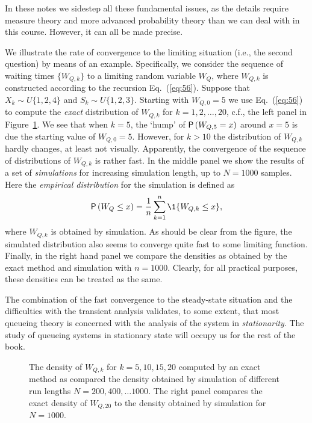 In these notes we sidestep all these fundamental issues, as the
details require measure theory and more advanced probability theory
than we can deal with in this course. However, it can all be made
precise. 

We illustrate the rate of convergence to the limiting situation (i.e., the second question) by means of an example. Specifically, we consider the sequence of waiting times $\{W_{Q,k}\}$ to a limiting random variable $W_Q$, where $W_{Q,k}$ is constructed according to the recursion
Eq.~(\ref{eq:56}). Suppose that $X_k\sim U\{1,2,4\}$ and
$S_k\sim U\{1,2,3\}$.  Starting with $W_{Q,0}=5$ we use
Eq.~(\ref{eq:56}) to compute the \emph{exact} distribution of
$W_{Q,k}$ for $k=1,2,\ldots, 20$, c.f., the left panel in
Figure~\ref{fig:convergence}. We see that when $k=5$, the `hump' of
$\P{W_{Q,5}=x}$ around $x=5$ is due the starting value of
$W_{Q,0}=5$. However, for $k>10$ the distribution of $W_{Q,k}$ hardly
changes, at least not visually. Apparently, the convergence of the
sequence of distributions of $W_{Q,k}$ is rather fast. In the middle
panel we show the results of a set of \emph{simulations} for
increasing simulation length, up to $N=1000$ samples. Here the
\emph{empirical distribution} for the simulation is defined as
\begin{equation*}
\P{W_Q\leq x} =   \frac 1n \sum_{k=1}^n \1{W_{Q,k} \leq x},
\end{equation*}
where $W_{Q,k}$ is obtained by simulation. As should be clear from the
figure, the simulated distribution also seems to converge quite fast to
some limiting function. Finally, in the right hand panel we compare
the densities as obtained by the exact method and simulation with
$n=1000$. Clearly, for all practical purposes, these densities can be
treated as the same.

The combination of the fast convergence to the steady-state situation
and the difficulties with the transient analysis validates, to some
extent, that most queueing theory is concerned with the analysis of
the system in \emph{stationarity}. The study of queueing systems in
stationary state will occupy us for the rest of the book.

\begin{figure}
  \centering



  \caption{The density of $W_{Q,k}$ for $k=5, 10, 15, 20$ computed by
    an exact method as compared the density obtained by simulation of
    different run lengths $N=200, 400, \ldots 1000$. The right panel
    compares the exact density of $W_{Q,20}$ to the density obtained by simulation
    for $N=1000$.}
\label{fig:convergence}
\end{figure}




